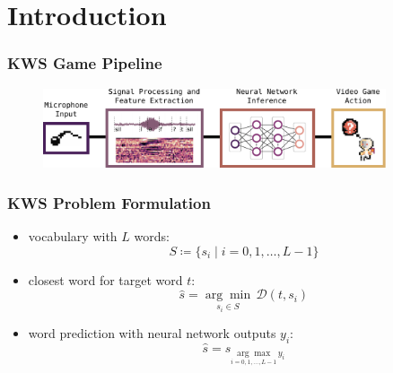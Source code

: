 
\section{Introduction}

\begin{frame}
  \frametitle{KWS Game Pipeline}
  \vfill
  \begin{figure} \includegraphics[width=0.9\textwidth]{../1_intro/figs/intro_kws.pdf} \end{figure}
  \scriptsize
  \vspace{0.3cm}
  \centering
\end{frame}

\begin{frame}
  \frametitle{KWS Problem Formulation}
  \begin{itemize}
    \item vocabulary with $L$ words:
    \begin{equation*}\label{eq:intro_kws_dict}
      S \coloneqq \{s_i \mid i = 0, 1, \dots, L - 1\}
    \end{equation*}

    \item closest word for target word $t$:
    \begin{equation*}\label{eq:intro_kws_task}
      \hat{s} = \underset{s_i \in S}{\arg \min} \, \mathcal{D}(t, s_i)
    \end{equation*}

    \item word prediction with neural network outputs $y_i$:
    \begin{equation*}\label{eq:intro_kws_class}
      \hat{s} = s_{\underset{i = 0, 1, \dots, L - 1}{\arg \max} \, y_i}
    \end{equation*}

  \end{itemize}
\end{frame}